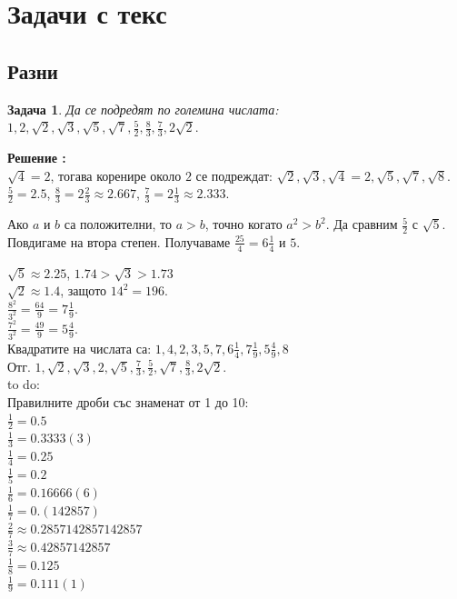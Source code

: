 \documentclass{article}
\newtheorem{problem}{Задача}
\newcounter{solution}
\newcommand\solution{%
	\stepcounter{solution}%
	\textbf{Решение :}\\%
}
\begin{document}
\section{Задачи с текс}

\subsection{Разни}

\begin{problem}
	Да се подредят по големина числата:
	$1, 2, \sqrt{2}, \sqrt{3}, \sqrt{5}, \sqrt{7}, 
	\frac{5}{2}, \frac{8}{3}, \frac{7}{3}, 2\sqrt{2}.  $
\end{problem}
\solution
$\sqrt{4} = 2$, тогава коренире около $2$ се подреждат:
$\sqrt2, \sqrt3, \sqrt4 = 2 , \sqrt5, \sqrt7, \sqrt8 $.
$ \frac{5}{2} = 2.5 $, $\frac{8}{3} = 2 \frac{2}{3} \approx 2.667$, $\frac{7}{3} = 2 \frac{1}{3} \approx 2.333  $.


Ако $a$ и $b$ са положителни, то $a > b $, точно когато $a^2 > b^2 $.
Да сравним $\frac{5}{2} $ с $\sqrt 5 $. Повдигаме на втора степен. Получаваме
$\frac{25}{4} = 6\frac{1}{4} $ и $5 $. 

$\sqrt{5} \approx 2.25$, $ 1.74 >\sqrt 3 > 1.73 $ \\
$\sqrt 2 \approx 1.4 $, защото $14^2 = 196 $. \\
$\frac{8^2}{3^2} = \frac{64}{9} = 7 \frac{1}{9} $. \\
$\frac{7^2}{3^2} = \frac{49}{9} = 5 \frac{4}{9} $. \\
Квадратите на числата са:
$1,4,2,3,5,7, 6\frac{1}{4}, 7 \frac{1}{9}, 5 \frac{4}{9},8  $ \\
Отг. 
$1, \sqrt 2, \sqrt 3, 2, \sqrt 5, \frac{7}{3}, \frac{5}{2}, \sqrt 7 , \frac{8}{3}, 2\sqrt2 $. \\


\vspace{2cm}
to do: \\
Правилните дроби със знаменат от 1 до 10: \\
$\frac{1}{2} = 0.5  $ \\
$\frac{1}{3} = 0.3333(3) $  \\
$\frac{1}{4} = 0.25  $ \\
$\frac{1}{5} = 0.2  $ \\
$\frac{1}{6} = 0.16666(6) $ \\
$\frac{1}{7} = 0.(142857) $ \\
$\frac{2}{7} \approx 0.2857142857142857 $ \\
$\frac{3}{7} \approx 0.42857142857 $ \\
$\frac{1}{8} = 0.125 $ \\
$\frac{1}{9} = 0.111(1) $ \\
\end{document}
